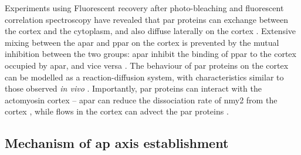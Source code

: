 Experiments using Fluorescent recovery after photo-bleaching and fluorescent correlation spectroscopy have revealed that \ac{par} proteins can exchange between the cortex and the cytoplasm, and also diffuse laterally on the cortex \citep{hoege2013principles,goehring2011proteins,schubert2000mex,petravsek2008characterization}. Extensive mixing between the \ac{apar} and \ac{ppar} on the cortex is prevented by the mutual inhibition between the two groups: \ac{apar} inhibit the binding of \ac{ppar} to the cortex occupied by \ac{apar}, and vice versa \citep{hoege2013principles,motegi2013network}. The behaviour of \ac{par} proteins on the cortex can be modelled as a reaction-diffusion system, with characteristics similar to those observed \emph{in vivo} \citep{hoege2013principles}. Importantly, \ac{par} proteins can interact with the actomyosin cortex -- \ac{apar} can reduce the dissociation rate of \ac{nmy2} from the cortex \citep{gross2019guiding}, while flows in the cortex can advect the \ac{par} proteins \citep{goehring2011advectionpolarization}. 

\subsection{Mechanism of \acs{ap} axis establishment}\label{subsec:mechanismApAxisEstablishment}

